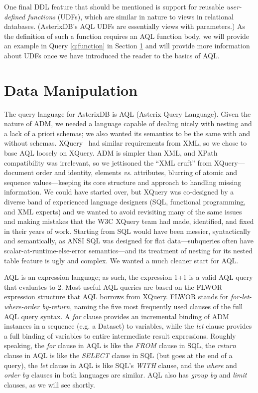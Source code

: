 One final DDL feature that should be mentioned is  support for reusable \emph{user-defined functions} (UDFs), which are similar in nature to views in relational databases.
(AsterixDB's AQL UDFs are essentially views with parameters.)
As the definition of such a function requires an AQL function body, we will provide an example in Query \ref{q:function} in Section \ref{ch:asterixdb:sec:dml} and will provide more information about UDFs once we have introduced the reader to the basics of AQL.



\section{Data Manipulation}
\label{ch:asterixdb:sec:dml}

The query language for AsterixDB is AQL (Asterix Query Language).
Given the nature of ADM, we needed a language capable of dealing nicely with nesting and a lack of a priori schemas; we also wanted its semantics to be the same with and without schemas.
XQuery~\cite{xquery} had similar requirements from XML, so we chose to base AQL loosely on XQuery. 
ADM is simpler than XML, and XPath compatibility was irrelevant, so we jettisoned the ``XML cruft'' from XQuery---document order and identity, elements \emph{vs.} attributes, blurring of atomic and sequence values---keeping its core structure and approach to handling missing information.
We could have started over, but XQuery was co-designed by a diverse band of experienced language designers (SQL, functional programming, and XML experts) and we wanted to avoid revisiting many of the same issues and making mistakes that the W3C XQuery team had made, identified, and fixed in their years of work.
Starting from SQL would have been messier, syntactically and semantically, as ANSI SQL was designed for flat data---subqueries often have scalar-at-runtime-else-error semantics---and its treatment of nesting for its nested table feature is ugly and complex.
We wanted a much cleaner start for AQL.

AQL is an expression language; as such, the expression 1+1 is a valid AQL query that evaluates to 2.  
Most useful AQL queries are based on the FLWOR expression structure that AQL borrows from XQuery. 
FLWOR stands for \emph{for-let-where-order by-return}, naming the five most frequently used clauses of the full AQL query syntax. 
A \emph{for} clause provides an incremental binding of ADM instances in a sequence (e.g. a Dataset) to variables, while the \emph{let} clause provides a full binding of variables to entire intermediate result expressions.
Roughly speaking, the \emph{for} clause in AQL is like the \emph{FROM} clause in SQL, the \emph{return} clause in AQL is like the \emph{SELECT} clause in SQL (but goes at the end of a query), the \emph{let} clause in AQL is like SQL's \emph{WITH} clause, and the \emph{where} and \emph{order by} clauses in both languages are similar.
AQL also has \emph{group by} and \emph{limit} clauses, as we will see shortly. 

